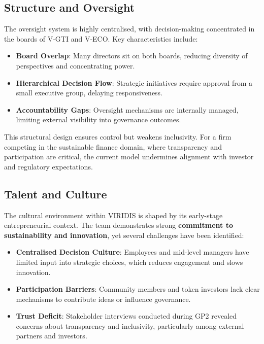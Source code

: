 \documentclass[
  english,
  12pt,
  oneside,
  open=any]{scrbook}
\providecommand{\tightlist}{%
  \setlength{\itemsep}{0pt}\setlength{\parskip}{0pt}}\usepackage{longtable,booktabs,array}
\begin{document}
\subsection{Structure and Oversight}\label{sec-oversight}

The oversight system is highly centralised, with decision-making
concentrated in the boards of V-GTI and V-ECO. Key characteristics
include:

\begin{itemize}
\tightlist
\item
  \textbf{Board Overlap}: Many directors sit on both boards, reducing
  diversity of perspectives and concentrating power.\\
\item
  \textbf{Hierarchical Decision Flow}: Strategic initiatives require
  approval from a small executive group, delaying responsiveness.\\
\item
  \textbf{Accountability Gaps}: Oversight mechanisms are internally
  managed, limiting external visibility into governance outcomes.
\end{itemize}

This structural design ensures control but weakens inclusivity. For a
firm competing in the sustainable finance domain, where transparency and
participation are critical, the current model undermines alignment with
investor and regulatory expectations.

\subsection{Talent and Culture}\label{sec-culture}

The cultural environment within VIRIDIS is shaped by its early-stage
entrepreneurial context. The team demonstrates strong \textbf{commitment
to sustainability and innovation}, yet several challenges have been
identified:

\begin{itemize}
\tightlist
\item
  \textbf{Centralised Decision Culture}: Employees and mid-level
  managers have limited input into strategic choices, which reduces
  engagement and slows innovation.\\
\item
  \textbf{Participation Barriers}: Community members and token investors
  lack clear mechanisms to contribute ideas or influence governance.\\
\item
  \textbf{Trust Deficit}: Stakeholder interviews conducted during GP2
  revealed concerns about transparency and inclusivity, particularly
  among external partners and investors.
\end{itemize}
\end{document}

